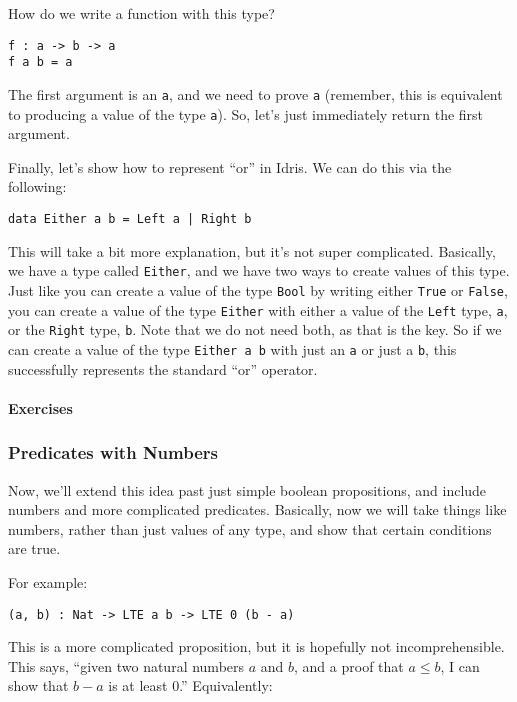 \documentclass{article}
\newcommand{\inline}[1]{\texttt{#1}}
\begin{document}
How do we write a function with this type?

\begin{verbatim}
f : a -> b -> a
f a b = a
\end{verbatim}

The first argument is an \inline{a}, and we need to prove \inline{a} (remember, this is equivalent to producing a value of the type \inline{a}).
So, let's just immediately return the first argument.

Finally, let’s show how to represent ``or'' in Idris.
We can do this via the following:

\begin{verbatim}
data Either a b = Left a | Right b
\end{verbatim}

This will take a bit more explanation, but it's not super complicated.
Basically, we have a type called \inline{Either}, and we have two ways to create values of this type.
Just like you can create a value of the type \inline{Bool} by writing either \inline{True} or \inline{False}, you can create a value of the type \inline{Either} with either a value of the \inline{Left} type, \inline{a}, or the \inline{Right} type, \inline{b}.
Note that we do not need both, as that is the key.
So if we can create a value of the type \inline{Either a b} with just an \inline{a} or just a \inline{b}, this successfully represents the standard ``or'' operator.

\paragraph{Exercises}

\subsubsection{Predicates with Numbers}
Now, we’ll extend this idea past just simple boolean propositions, and include numbers and more complicated predicates.
Basically, now we will take things like numbers, rather than just values of any type, and show that certain conditions are true.

For example:

\begin{verbatim}
(a, b) : Nat -> LTE a b -> LTE 0 (b - a)
\end{verbatim}

This is a more complicated proposition, but it is hopefully not incomprehensible.
This says, “given two natural numbers $a$ and $b$, and a proof that $a \leq b$, I can show that $b - a$ is at least $0$.”
Equivalently:
\end{document}
